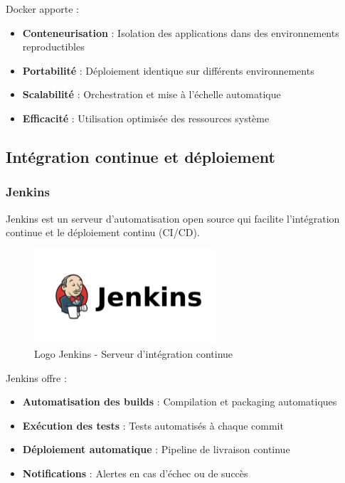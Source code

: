\documentclass[12pt,a4paper]{report}
\begin{document}
Docker apporte :
\begin{itemize}
    \item \textbf{Conteneurisation} : Isolation des applications dans des environnements reproductibles
    \item \textbf{Portabilité} : Déploiement identique sur différents environnements
    \item \textbf{Scalabilité} : Orchestration et mise à l'échelle automatique
    \item \textbf{Efficacité} : Utilisation optimisée des ressources système
\end{itemize}

\subsection{Intégration continue et déploiement}

\subsubsection{Jenkins}

Jenkins est un serveur d'automatisation open source qui facilite l'intégration continue et le déploiement continu (CI/CD).

\begin{figure}[htbp]
    \centering
    \includegraphics[width=0.6\textwidth]{latex_media/media/jenkins.png}
    \caption{Logo Jenkins - Serveur d'intégration continue}
    \label{fig:jenkins-logo}
\end{figure}

Jenkins offre :
\begin{itemize}
    \item \textbf{Automatisation des builds} : Compilation et packaging automatiques
    \item \textbf{Exécution des tests} : Tests automatisés à chaque commit
    \item \textbf{Déploiement automatique} : Pipeline de livraison continue
    \item \textbf{Notifications} : Alertes en cas d'échec ou de succès
\end{itemize}
\end{document}
